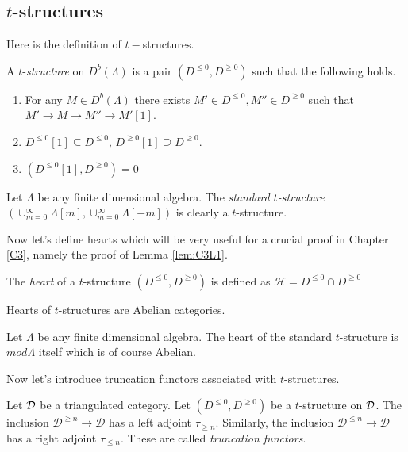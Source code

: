 \subsection{$t$-structures}
\indent Here is the definition of $t-$structures.
\begin{definition}
A $t$-\textit{structure} on $D^b(\Lambda)$ is a pair $(D^{\leq 0},D^{\geq 0})$ such that the following holds.
\begin{enumerate}
\item For any $M\in D^b(\Lambda)$ there exists $M'\in D^{\leq 0}, M''\in D^{\geq 0}$ such that $M'\to M\to M''\to M'[1]$.
\item $D^{\leq 0}[1]\subseteq D^{\leq 0}$,  $D^{\geq 0}[1]\supseteq D^{\geq 0}$.
\item $(D^{\leq 0}[1], D^{\geq 0}) = 0$
\end{enumerate}
\end{definition}
\begin{example}
Let $\Lambda$ be any finite dimensional algebra. The \textit{standard $t$-structure}\\ $(\cup_{m=0}^{\infty}\Lambda[m], \cup_{m=0}^{\infty}\Lambda[-m])$ is clearly a $t$-structure.
\end{example}
\indent Now let's define hearts which will be very useful for a crucial proof in Chapter \ref{C3}, namely the proof of Lemma \ref{lem:C3L1}.
\begin{definition}
The \textit{heart} of a $t$-structure $(D^{\leq 0},D^{\geq 0})$ is defined as $\mathcal{H} = D^{\leq 0}\cap D^{\geq 0}$
\end{definition}
\begin{theorem}
\cite{BBD} Hearts of $t$-structures are Abelian categories. 
\end{theorem}
\begin{example}
Let $\Lambda$ be any finite dimensional algebra. The heart of the standard $t$-structure is $mod \Lambda$ itself which is of course Abelian.
\end{example}
\indent Now let's introduce truncation functors associated with $t$-structures. 
\begin{lemma}
\cite{BBD}  Let $\mathcal{D}$ be a triangulated category. Let $(D^{\leq 0},D^{\geq 0})$ be a $t$-structure on $\mathcal{D}$. The inclusion ${\mathcal{D}^{\geq n} \rightarrow \mathcal{D}}$ has a left adjoint ${\tau_{\geq n}}$. Similarly, the inclusion ${\mathcal{D}^{\leq n} \rightarrow \mathcal{D}}$ has a right adjoint ${\tau_{\leq n}}$. These are called \textit{truncation functors}.
\end{lemma}
